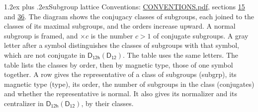\documentclass[10pt,a4paper]{article}
\makeatletter
\renewcommand\section{\@startsection{section}{1}{\z@}{-3ex plus -1ex minus -.2ex}%
  {1.2ex plus .2ex}{\normalfont\large\sffamily\bfseries\color{parttitle}}}
\numberwithin{equation}{section}
\newcommand{\grp}[1]{\mathsf{#1}}
\makeatother
\begin{document}
\section{Subgroup lattice}\label{s:subgroups}
Conventions: \href{../../CONVENTIONS.pdf}{CONVENTIONS.pdf}, sections \href{../../../rotation/CONVENTIONS.pdf\#conv.15}{15} and \href{../../CONVENTIONS.pdf\#conv.36}{36}.
The diagram shows the conjugacy classes of subgroups, each joined to the classes of its maximal subgroups, and the orders increase upward. \label{n:index.conjugates.c}\label{n:mark.conjugates}A normal subgroup is framed, and ${\times}c$ is the number $c > 1$ of conjugate subgroups. \label{n:mark.letter}A gray letter after a symbol distinguishes the classes of subgroups with that symbol, which are not conjugate in $\grp{D_{12h}}(\grp{D_{12}})$. The table uses the same letters. The table lists the classes by order, then by magnetic type, those of one symbol together. \label{n:head.subgroup}\label{n:head.magnetic.type}\label{n:head.order}\label{n:head.conjugates}\label{n:head.normal}A row gives the representative of a class of subgroups (subgrp), its magnetic type (type), its order, the number of subgroups in the class (conjugates) and whether the representative is normal. \label{n:head.normalizer}\label{n:head.centralizer}It also gives its normalizer and its centralizer in $\grp{D_{12h}}(\grp{D_{12}})$, by their classes. 
\end{document}

